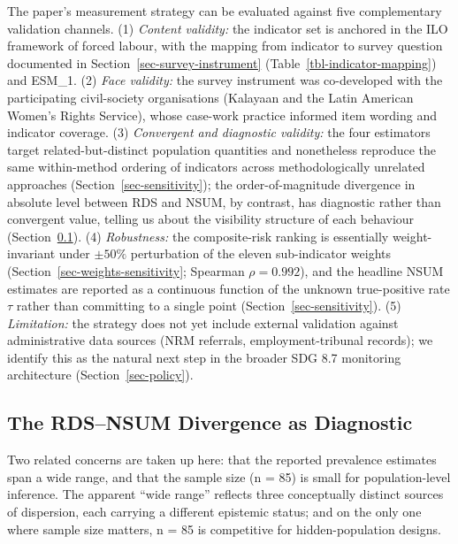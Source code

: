 \documentclass[
  12pt,
  letterpaper,
  DIV=11,
  numbers=noendperiod]{scrartcl}
\begin{document}
The paper's measurement strategy can be evaluated against five
complementary validation channels. (1) \emph{Content validity:} the
indicator set is anchored in the ILO
\autocite*{ILO11-indicators,international_labour_organization_global_2017}
framework of forced labour, with the mapping from indicator to survey
question documented in Section~\ref{sec-survey-instrument}
(Table~\ref{tbl-indicator-mapping}) and ESM\_1. (2) \emph{Face
validity:} the survey instrument was co-developed with the participating
civil-society organisations (Kalayaan and the Latin American Women's
Rights Service), whose case-work practice informed item wording and
indicator coverage. (3) \emph{Convergent and diagnostic validity:} the
four estimators target related-but-distinct population quantities and
nonetheless reproduce the same within-method ordering of indicators
across methodologically unrelated approaches
(Section~\ref{sec-sensitivity}); the order-of-magnitude divergence in
absolute level between RDS and NSUM, by contrast, has diagnostic rather
than convergent value, telling us about the visibility structure of each
behaviour (Section~\ref{sec-divergence}). (4) \emph{Robustness:} the
composite-risk ranking is essentially weight-invariant under
\(\pm 50\%\) perturbation of the eleven sub-indicator weights
(Section~\ref{sec-weights-sensitivity}; Spearman \(\rho = 0.992\)), and
the headline NSUM estimates are reported as a continuous function of the
unknown true-positive rate \(\tau\) rather than committing to a single
point (Section~\ref{sec-sensitivity}). (5) \emph{Limitation:} the
strategy does not yet include external validation against administrative
data sources (NRM referrals, employment-tribunal records); we identify
this as the natural next step in the broader SDG 8.7 monitoring
architecture (Section~\ref{sec-policy}).

\subsection{The RDS--NSUM Divergence as
Diagnostic}\label{sec-divergence}

Two related concerns are taken up here: that the reported prevalence
estimates span a wide range, and that the sample size (n = 85) is small
for population-level inference. The apparent ``wide range'' reflects
three conceptually distinct sources of dispersion, each carrying a
different epistemic status; and on the only one where sample size
matters, n = 85 is competitive for hidden-population designs.
\end{document}
